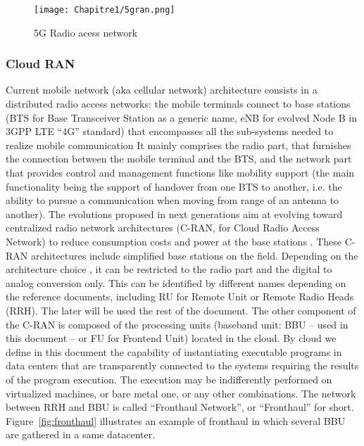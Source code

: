  \begin{figure}[h]
      \begin{center}
      \texttt{[image: Chapitre1/5gran.png]}
      \end{center}
      \caption{5G Radio acess network}\label{fig:5gran}
      \end{figure}

\subsubsection{Cloud RAN}
Current mobile network (aka cellular network) architecture consists in a distributed radio access networks: the mobile terminals connect to base stations (BTS for Base Transceiver Station as a generic name, eNB for evolved Node B in 3GPP LTE “4G” standard) that encompasses all the sub-systems needed to realize mobile communication \cite{bouguen2012lte} It mainly comprises the radio part, that furnishes the connection between the mobile terminal and the BTS, and the network part that provides control and management functions like mobility support (the main functionality being the support of handover from one BTS to another, i.e. the ability to pursue a communication when moving from range of an antenna to another). The evolutions proposed in next generations aim at evolving toward centralized radio network architectures (C-RAN, for Cloud Radio Access Network) to reduce consumption costs and power at the base stations \cite{mobile2011c}. These C-RAN architectures include simplified base stations on the field. Depending on the architecture choice  
, it can be restricted to the radio part and the digital to analog conversion only. This can be identified by different names depending on the reference documents, including RU for Remote Unit or Remote Radio Heads (RRH). The later will be used the rest of the document. The other component of the C-RAN is composed of the processing units (baseband unit: BBU – used in this document – or FU for Frontend Unit) located in the cloud. By cloud we define in this document the capability of instantiating executable programs in data centers that are transparently connected to the systems requiring the results of the program execution. The execution may be indifferently performed on virtualized machines, or bare metal one, or any other combinations. The network between RRH and BBU is called “Fronthaul Network”, or “Fronthaul” for short. Figure~\ref{fig:fronthaul} illustrates an example of fronthaul in which several BBU are gathered in a same datacenter. 

